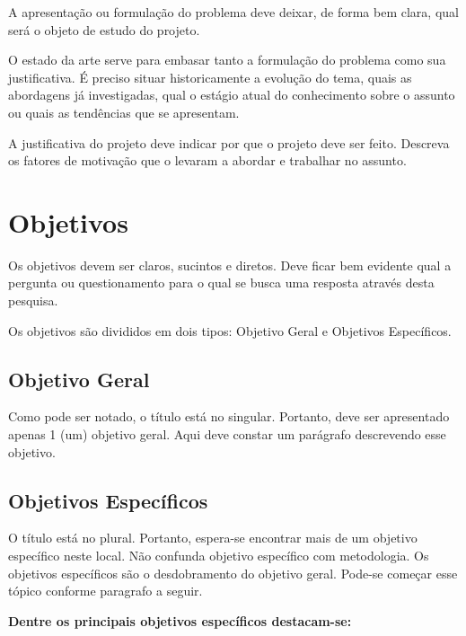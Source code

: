 \documentclass[
    12pt,               %
    a4paper,            %
    english,            %
    brazil,             %
    ]{article}
\begin{document}
A apresentação ou formulação do problema deve deixar, de forma bem clara, qual será o objeto de estudo do projeto.

O estado da arte serve para embasar tanto a formulação do problema como sua justificativa. É preciso situar historicamente a evolução do tema,
quais as abordagens já investigadas, qual o estágio atual do conhecimento sobre o assunto ou quais as tendências que se apresentam.

A justificativa do projeto deve indicar por que o projeto deve ser feito. Descreva os fatores de motivação que o levaram a abordar e trabalhar no assunto.

\section{Objetivos}



Os objetivos devem ser claros, sucintos e diretos. Deve ficar bem evidente qual a pergunta ou questionamento para o qual se busca uma resposta através desta pesquisa.

Os objetivos são divididos em dois tipos: Objetivo Geral e Objetivos Específicos.

\subsection{Objetivo Geral}

Como pode ser notado, o título está no singular. Portanto, deve ser apresentado apenas 1 (um) objetivo geral. Aqui deve constar um parágrafo descrevendo esse objetivo.

\subsection{Objetivos Específicos}

O título está no plural. Portanto, espera-se encontrar mais de um objetivo específico neste local. Não confunda objetivo específico com metodologia.
Os objetivos específicos são o desdobramento do objetivo geral. Pode-se começar esse tópico conforme paragrafo a seguir.

{\bf Dentre os principais objetivos específicos destacam-se: }
\end{document}
